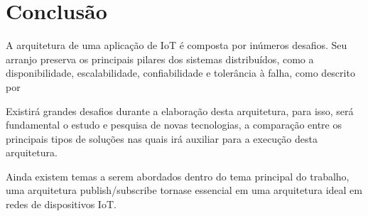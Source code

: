 \chapter{\textbf{Conclusão}} %
A arquitetura de uma aplicação de IoT é composta por inúmeros desafios. Seu arranjo preserva os principais pilares dos sistemas distribuídos, como a disponibilidade, escalabilidade, confiabilidade e tolerância à falha, como descrito por \cite{vanSteen2016}\par
Existirá grandes desafios durante a elaboração desta arquitetura, para isso, será fundamental o estudo e pesquisa de novas tecnologias, a comparação entre os principais tipos de soluções  nas quais irá auxiliar para a execução desta arquitetura.\par
Ainda existem temas a serem abordados dentro do tema principal do trabalho, uma arquitetura publish/subscribe tornase essencial em uma arquitetura ideal em redes de dispositivos IoT.\par
